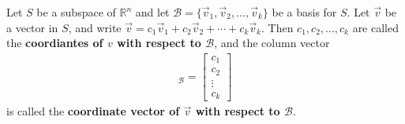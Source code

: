\documentclass{article}
\begin{document}
\begin{definition}
	Let $S$ be a subspace of $\mathbb{R}^n$ and let $\mathcal{B}=\{\vec v_1, \vec v_2, ..., \vec v_k\}$ be a basis for $S$. Let $\vec v$ be a vector in $S$, and write $\vec v = c_1\vec v_1 + c_2\vec v_2 + \cdots + c_k\vec v_k$. Then $c_1, c_2, ..., c_k$ are called the \textbf{coordiantes of $v$ with respect to $\mathcal{B}$}, and the column vector
	\begin{gather*}
		[\vec v]_\mathcal{B} = \begin{bmatrix}
			c_1 \\c_2\\\vdots\\c_k
		\end{bmatrix}
	\end{gather*}
	is called the \textbf{coordinate vector of $\vec v$ with respect to $\mathcal{B}$}.
\end{definition}
\setcounter{subsection}{5}
\end{document}
